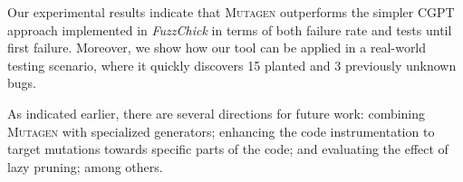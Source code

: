 \documentclass[sigconf,review,anonymous]{acmart}
\newcommand{\fuzzchick}{\textit{FuzzChick}\xspace}
\newcommand{\mutagen}{\textsc{Mutagen}\xspace}
\begin{document}
Our experimental results indicate that \mutagen outperforms the simpler CGPT
approach implemented in \fuzzchick in terms of both failure rate and tests until
first failure.
%
Moreover, we show how our tool can be applied in a real-world testing scenario,
where it quickly discovers 15 planted and 3 previously unknown bugs.


As indicated earlier, there are several directions for future work:
%
combining \mutagen with specialized generators; enhancing the code
instrumentation to target mutations towards specific parts of the code; and
evaluating the effect of lazy pruning; among others.






\balance





\end{document}

